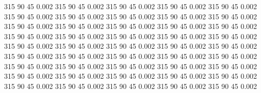 315            90            45         0.002
315            90            45         0.002
315            90            45         0.002
315            90            45         0.002
315            90            45         0.002
315            90            45         0.002
315            90            45         0.002
315            90            45         0.002
315            90            45         0.002
315            90            45         0.002
315            90            45         0.002
315            90            45         0.002
315            90            45         0.002
315            90            45         0.002
315            90            45         0.002
315            90            45         0.002
315            90            45         0.002
315            90            45         0.002
315            90            45         0.002
315            90            45         0.002
315            90            45         0.002
315            90            45         0.002
315            90            45         0.002
315            90            45         0.002
315            90            45         0.002
315            90            45         0.002
315            90            45         0.002
315            90            45         0.002
315            90            45         0.002
315            90            45         0.002
315            90            45         0.002
315            90            45         0.002
315            90            45         0.002
315            90            45         0.002
315            90            45         0.002
315            90            45         0.002
315            90            45         0.002
315            90            45         0.002
315            90            45         0.002
315            90            45         0.002
315            90            45         0.002
315            90            45         0.002
315            90            45         0.002
315            90            45         0.002
315            90            45         0.002
